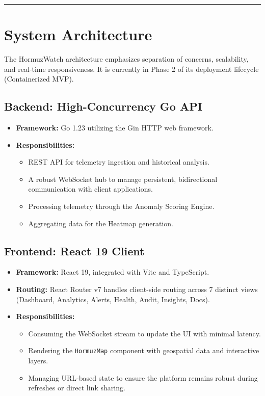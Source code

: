 \documentclass[11pt,a4paper]{article}
\begin{document}
\noindent\textcolor{textsecondary}{\rule{\textwidth}{0.5pt}}

\section{System Architecture}
The HormuzWatch architecture emphasizes separation of concerns, scalability, and real-time responsiveness. It is currently in Phase 2 of its deployment lifecycle (Containerized MVP).

\subsection{Backend: High-Concurrency Go API}
\begin{itemize}
    \item \textbf{Framework:} Go 1.23 utilizing the Gin HTTP web framework.
    \item \textbf{Responsibilities:}
    \begin{itemize}
        \item REST API for telemetry ingestion and historical analysis.
        \item A robust WebSocket hub to manage persistent, bidirectional communication with client applications.
        \item Processing telemetry through the Anomaly Scoring Engine.
        \item Aggregating data for the Heatmap generation.
    \end{itemize}
\end{itemize}

\subsection{Frontend: React 19 Client}
\begin{itemize}
    \item \textbf{Framework:} React 19, integrated with Vite and TypeScript.
    \item \textbf{Routing:} React Router v7 handles client-side routing across 7 distinct views (Dashboard, Analytics, Alerts, Health, Audit, Insights, Docs).
    \item \textbf{Responsibilities:}
    \begin{itemize}
        \item Consuming the WebSocket stream to update the UI with minimal latency.
        \item Rendering the \texttt{HormuzMap} component with geospatial data and interactive layers.
        \item Managing URL-based state to ensure the platform remains robust during refreshes or direct link sharing.
    \end{itemize}
\end{itemize}
\end{document}
